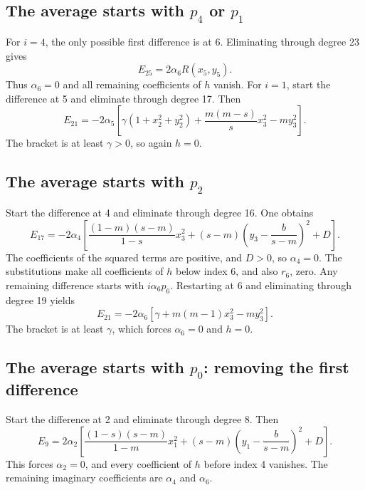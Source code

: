 \documentclass[11pt,a4paper]{article}
\begin{document}
\subsection{The average starts with \texorpdfstring{$p_4$ or $p_1$}{p4 or p1}}
For $i=4$, the only possible first difference is at 6. Eliminating through
degree 23 gives
\[
 E_{25}=2\alpha_6R(x_5,y_5).
\]
Thus $\alpha_6=0$ and all remaining coefficients of $h$ vanish.
For $i=1$, start the difference at 5 and eliminate through degree 17. Then
\[
 E_{21}=-2\alpha_5\left[
 \gamma(1+x_2^2+y_2^2)+\frac{m(m-s)}s x_3^2-my_3^2\right].
\]
The bracket is at least $\gamma>0$, so again $h=0$.

\subsection{The average starts with \texorpdfstring{$p_2$}{p2}}
Start the difference at 4 and eliminate through degree 16. One obtains
\[
 E_{17}=-2\alpha_4\left[
 \frac{(1-m)(s-m)}{1-s}x_3^2
 +(s-m)\left(y_3-\frac b{s-m}\right)^2+D\right].
\]
The coefficients of the squared terms are positive, and $D>0$, so $\alpha_4=0$.
The substitutions make all coefficients of $h$ below index 6, and also
$r_6$, zero. Any remaining difference starts with $i\alpha_6p_6$.
Restarting at 6 and eliminating through degree 19 yields
\[
 E_{21}=-2\alpha_6\left[\gamma+m(m-1)x_3^2-my_3^2\right].
\]
The bracket is at least $\gamma$, which forces $\alpha_6=0$ and $h=0$.

\subsection{The average starts with \texorpdfstring{$p_0$}{p0}: removing the first difference}
Start the difference at 2 and eliminate through degree 8. Then
\[
 E_9=2\alpha_2\left[
 \frac{(1-s)(s-m)}{1-m}x_1^2
 +(s-m)\left(y_1-\frac b{s-m}\right)^2+D\right].
\]
This forces $\alpha_2=0$, and every coefficient of $h$ before index 4
vanishes. The remaining imaginary coefficients are $\alpha_4$ and $\alpha_6$.
\end{document}
